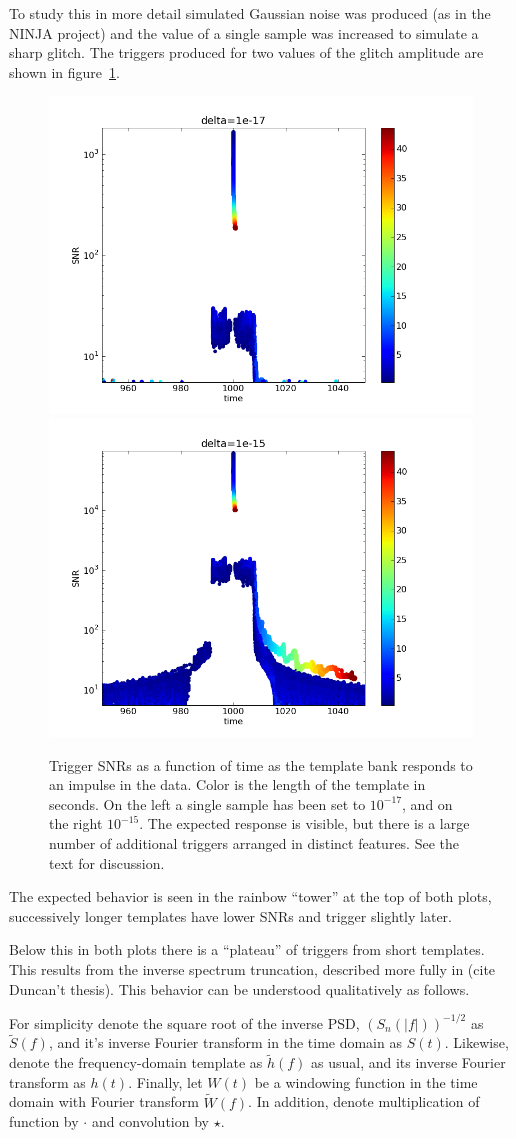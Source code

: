 To study this in more detail simulated Gaussian noise was produced (as
in the NINJA project) and the value of a single sample was increased to
simulate a sharp glitch.  The triggers produced for two values of the
glitch amplitude are shown in
figure~\ref{f:impulses_original_no_chisq}.

\begin{figure}
  \includegraphics[width=0.5\linewidth]{figures/detchar/raw1_1e-17}
  \includegraphics[width=0.5\linewidth]{figures/detchar/raw1_1e-15}
  \caption[Response of the template bank to an impulse] {
  \label{f:impulses_original_no_chisq}
Trigger SNRs as a function of time as the template bank responds to an
impulse in the data.  Color is the length of the template in seconds.
On the left a single sample has been set to $10^{-17}$, and on the
right $10^{-15}$.  The expected response is visible, but there is a
large number of additional triggers arranged in distinct features.
See the text for discussion.
}
\end{figure}%

The expected behavior is seen in the rainbow ``tower'' at the top of
both plots, successively longer templates have lower SNRs and trigger
slightly later.

Below this in both plots there is a ``plateau'' of triggers from short
templates.  This results from the inverse spectrum truncation,
described more fully in (cite Duncan't thesis).  This behavior can be
understood qualitatively as follows.

For simplicity denote the square root of the inverse PSD,
$(S_n(|f|))^{-1/2}$ as $\tilde{S}(f)$, and it's inverse Fourier
transform in the time domain as $S(t)$.  Likewise, denote the
frequency-domain template as $\tilde{h}(f)$ as usual, and its inverse
Fourier transform as $h(t)$.  Finally, let $W(t)$ be a windowing
function in the time domain with Fourier transform $\tilde{W}(f)$.  In
addition, denote multiplication of function by $\cdot$ and convolution
by $\star$.

